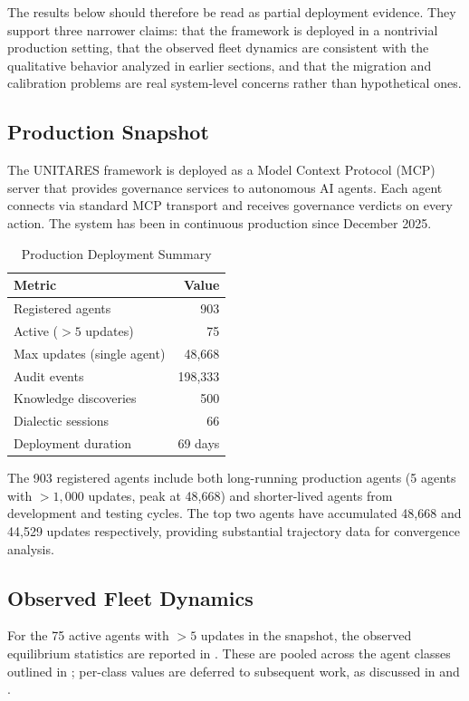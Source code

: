 \documentclass[11pt,twocolumn]{article}
\begin{document}
The results below should therefore be read as partial deployment
evidence. They support three narrower claims: that the framework is
deployed in a nontrivial production setting, that the observed fleet
dynamics are consistent with the qualitative behavior analyzed in
earlier sections, and that the migration and calibration problems are
real system-level concerns rather than hypothetical ones.

\subsection{Production Snapshot}

The UNITARES framework is deployed as a Model Context Protocol (MCP)
server that provides governance services to autonomous AI agents. Each
agent connects via standard MCP transport and receives governance
verdicts on every action. The system has been in continuous production
since December 2025.

\begin{table}[htbp]
\centering
\small
\caption{Production Deployment Summary}
\label{tab:deployment}
\begin{tabular}{@{}lr@{}}
\toprule
\textbf{Metric} & \textbf{Value} \\
\midrule
Registered agents & 903 \\
Active ($>5$ updates) & 75 \\
Max updates (single agent) & 48{,}668 \\
Audit events & 198{,}333 \\
Knowledge discoveries & 500 \\
Dialectic sessions & 66 \\
Deployment duration & 69 days \\
\bottomrule
\end{tabular}
\end{table}

The 903 registered agents include both long-running production agents
(5 agents with $>1{,}000$ updates, peak at 48{,}668) and shorter-lived
agents from development and testing cycles. The top two agents have
accumulated 48{,}668 and 44{,}529 updates respectively, providing
substantial trajectory data for convergence analysis.


\subsection{Observed Fleet Dynamics}

For the 75 active agents with $>5$ updates in the snapshot, the
observed equilibrium statistics are reported in
. These are pooled across the agent
classes outlined in ; per-class values are
deferred to subsequent work, as discussed in
 and .
\end{document}

